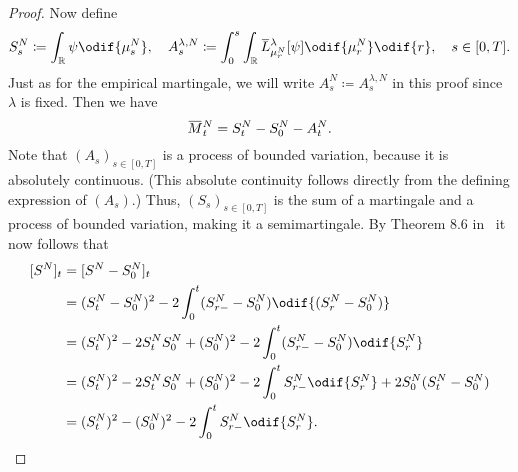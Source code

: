\begin{proof}
  Now define
  \begin{equation}
    S_s^N \coloneqq \int_\potspace \psi \odif{\mu_s^N},
    \quad
    A_s^{\lambda, N} \coloneqq \int_0^s \int_\potspace \ol{L}_{\mu_r^N}^{\lambda} [\psi] \odif{\mu_{r}^N} \odif{r}, \quad s \in [0,T].
  \end{equation}
  Just as for the empirical martingale, we will write \( A_s^N \coloneqq A_s^{\lambda, N} \) in this proof since \( \lambda \) is fixed.
  Then we have
  \begin{equation}\label{eq:M=S-A}
    \ol{M}_t^N = S_t^N - S_0^N - A_t^N.
  \end{equation}
  Note that \((A_s)_{s\in[0,T]}\) is a process of bounded variation, because it is absolutely continuous. %
  (This absolute continuity follows directly from the defining expression of \((A_s)\).) %
  Thus, \((S_s)_{s\in[0,T]}\) is the sum of a martingale and a process of bounded variation, making it a semimartingale.
  By Theorem 8.6 in~\cite[221]{klebanerIntroductionStochasticCalculus2012} it now follows that
  \begin{equation}\label{eq:S^2-q-var-rel}
    \begin{split}
      \sbr{S^N}_t & = \sbr{S^N - S_0^N}_t                                                                                \\   %
                  & = (S_t^N - S_0^N)^2 - 2 \int_0^t (S_{r-}^N - S_0^N) \odif{\br{S_r^N - S_0^N}}                        \\
                  & = (S_t^N)^2 - 2 S_t^N S_0^N + (S_0^N)^2 - 2 \int_0^t (S_{r-}^N - S_0^N) \odif{S_r^N}                 \\   %
                  & = (S_t^N)^2 - 2 S_t^N S_0^N + (S_0^N)^2 - 2 \int_0^t S_{r-}^N \odif{S_r^N} + 2 S_0^N (S_t^N - S_0^N) \\
                  & = (S_t^N)^2 - (S_0^N)^2 - 2 \int_0^t S_{r-}^N \odif{S_r^N}.
    \end{split}
  \end{equation}


\end{proof}
